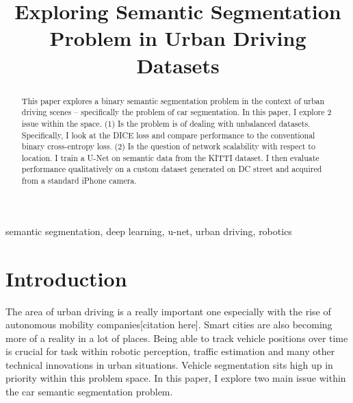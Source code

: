 \documentclass[Location Location Location! : Exploring Image Segmentation Problem In Urban Driving Scenarios]{IEEEtran}
\begin{document}
\title{Exploring Semantic Segmentation Problem in Urban Driving Datasets\\

}

\author{
}

\maketitle

\begin{abstract}
This paper explores a binary semantic segmentation problem in the context of urban driving scenes -- specifically the problem of car segmentation. In this paper, I explore 2 issue within the space. (1) Is the problem is of dealing with unbalanced datasets. Specifically, I look at the DICE loss and compare performance to the conventional binary cross-entropy loss. (2) Is the question of network scalability with respect to location. I train a U-Net on semantic data from the KITTI \cite{kitti} dataset. I then evaluate performance qualitatively on a custom dataset generated on DC street and acquired from a standard iPhone camera.


\end{abstract}

\begin{IEEEkeywords}
semantic segmentation, deep learning, u-net, urban driving, robotics
\end{IEEEkeywords}

\section{Introduction}

The area of urban driving is a really important one especially with the rise of autonomous mobility companies[citation here]. Smart cities are also becoming more of a reality in a lot of places. Being able to track vehicle positions over time is crucial for task within robotic perception, traffic estimation and many other technical innovations in urban situations. Vehicle segmentation sits high up in priority within this problem space. In this paper, I explore two main issue within the car semantic segmentation problem. 
\end{document}
